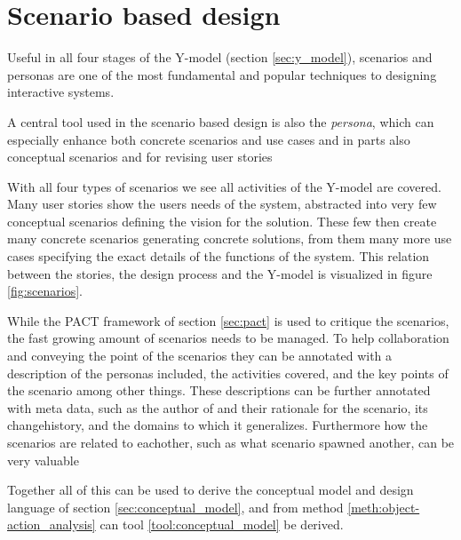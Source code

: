 \section{Scenario based design} \label{sec:scenario_based_design}
Useful in all four stages of the Y-model (section \ref{sec:y_model}), scenarios and personas are one of the most fundamental and popular techniques to designing interactive systems. \cite[p. 62]{benyon14}






A central tool used in the scenario based design is also the \emph{persona}, which can especially enhance both concrete scenarios and use cases and in parts also conceptual scenarios and for revising user stories



With all four types of scenarios we see all activities of the Y-model are covered. Many user stories show the users needs of the system, abstracted into very few conceptual scenarios defining the vision for the solution. These few then create many concrete scenarios generating concrete solutions, from them many more use cases specifying the exact details of the functions of the system. This relation between the stories, the design process and the Y-model is visualized in figure \ref{fig:scenarios}. \cite[p. 66, 196]{benyon14}





While the PACT framework of section \ref{sec:pact} is used to critique the scenarios, the fast growing amount of scenarios needs to be managed. To help collaboration and conveying the point of the scenarios they can be annotated with a description of the personas included, the activities covered, and the key points of the scenario among other things. These descriptions can be further annotated with meta data, such as the author of and their rationale for the scenario, its changehistory, and the domains to which it generalizes. Furthermore how the scenarios are related to eachother, such as what scenario spawned another, can be very valuable \cite[p. 70,72]{benyon14}





Together all of this can be used to derive the conceptual model and design language of section \ref{sec:conceptual_model}, and from method \ref{meth:object-action_analysis} can tool \ref{tool:conceptual_model} be derived. \cite[p. 67]{benyon14}
